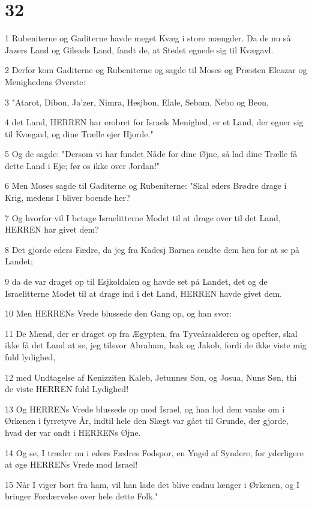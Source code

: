 \chapter{32}

\par 1 Rubeniterne og Gaditerne havde meget Kvæg i store mængder. Da de nu så Jazers Land og Gileads Land, fandt de, at Stedet egnede sig til Kvægavl.
\par 2 Derfor kom Gaditerne og Rubeniterne og sagde til Moses og Præsten Eleazar og Menighedens Øverste:
\par 3 "Atarot, Dibon, Ja'zer, Nimra, Hesjbon, Elale, Sebam, Nebo og Beon,
\par 4 det Land, HERREN har erobret for Israels Menighed, er et Land, der egner sig til Kvægavl, og dine Trælle ejer Hjorde."
\par 5 Og de sagde: "Dersom vi har fundet Nåde for dine Øjne, så lad dine Trælle få dette Land i Eje; før os ikke over Jordan!"
\par 6 Men Moses sagde til Gaditerne og Rubeniterne: "Skal eders Brødre drage i Krig, medens I bliver boende her?
\par 7 Og hvorfor vil I betage Israelitterne Modet til at drage over til det Land, HERREN har givet dem?
\par 8 Det gjorde eders Fædre, da jeg fra Kadesj Barnea sendte dem hen for at se på Landet;
\par 9 da de var draget op til Esjkoldalen og havde set på Landet, det og de Israelitterne Modet til at drage ind i det Land, HERREN havde givet dem.
\par 10 Men HERRENs Vrede blussede den Gang op, og han svor:
\par 11 De Mænd, der er draget op fra Ægypten, fra Tyveårsalderen og opefter, skal ikke få det Land at se, jeg tilsvor Abraham, Isak og Jakob, fordi de ikke viste mig fuld lydighed,
\par 12 med Undtagelse af Kenizziten Kaleb, Jetunnes Søn, og Josua, Nuns Søn, thi de viste HERREN fuld Lydighed!
\par 13 Og HERRENs Vrede blussede op mod Israel, og han lod dem vanke om i Ørkenen i fyrretyve År, indtil hele den Slægt var gået til Grunde, der gjorde, hvad der var ondt i HERRENs Øjne.
\par 14 Og se, I træder nu i eders Fædres Fodspor, en Yngel af Syndere, for yderligere at øge HERRENs Vrede mod Israel!
\par 15 Når I viger bort fra ham, vil han lade det blive endnu længer i Ørkenen, og I bringer Fordærvelse over hele dette Folk."
